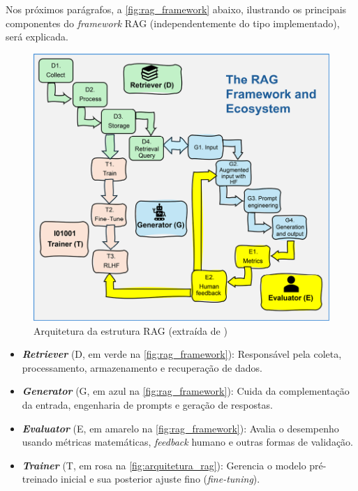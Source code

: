 \documentclass[a4paper, 12pt]{article}
\newcommand{\citeb}[1]{\bibleftbracket\cite{#1}\bibrightbracket}
\begin{document}
    Nos próximos parágrafos, a \autoref{fig:rag_framework} abaixo, ilustrando os principais componentes do \textit{framework} RAG (independentemente do tipo implementado), será explicada.

    \begin{figure}[h]
        \includegraphics[width=\textwidth,height=0.9\textheight,keepaspectratio]{rag-framework-ecosystem-denis-rothman.png}
        \centering
        \caption{Arquitetura da estrutura RAG (extraída de \citeb{rothman})}
        \centering
        \label{fig:rag_framework}
    \end{figure}

    \begin{itemize}
        \item \textbf{\textit{Retriever}} (D, em verde na \autoref{fig:rag_framework}): Responsável pela coleta, processamento, armazenamento e recuperação de dados.
        \item \textbf{\textit{Generator}} (G, em azul na \autoref{fig:rag_framework}): Cuida da complementação da entrada, engenharia de prompts e geração de respostas.
        \item \textbf{\textit{Evaluator}} (E, em amarelo na \autoref{fig:rag_framework}): Avalia o desempenho usando métricas matemáticas, \textit{feedback} humano e outras formas de validação.
        \item \textbf{\textit{Trainer}} (T, em rosa na \autoref{fig:arquitetura_rag}): Gerencia o modelo pré-treinado inicial e sua posterior ajuste fino (\textit{fine-tuning}).
    \end{itemize}
\end{document}
